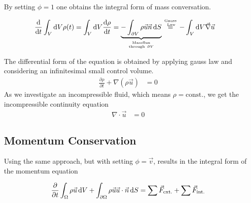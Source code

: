 By setting $\phi = 1$ one obtains the integral form of mass conversation.

\begin{align}
    \frac{\dif}{\dif t} \int_{V}\dif V \rho(t) =  \int_{V}\dif V \frac{\dif \rho}{\dif t}  &= \underbrace{-\int_{\partial V}
     \rho \vec{u}\vec{n}\dif S}_{\mathrm{Massflux} \atop \mathrm{through \ } \partial V} \stackrel{\text{Gauss} \atop \text{ Law}}{=} -\int_V \dif V \vec{\nabla}\vec{u}
\end{align}

The differential form of the equation is obtained by applying gauss law and considering an infinitesimal small control volume.
\begin{align}
     \frac{\partial \rho}{\partial t}  + \nabla \left(\rho \vec{u}\right) &= 0
\end{align}
As we investigate an incompressible fluid, which means $\rho = \text{const.}$, we get the incompressible continuity equation
\begin{align}
     \nabla \cdot \vec{u} &= 0
\end{align}


\subsection{Momentum Conservation}

Using the same approach, but with setting $\phi = \vec{v}$, results in the integral form of the momentum equation

\begin{align}
    \label{theorie:intimpulse}
    \pdn[]{t} \int_\Omega \rho \vec{u}\dif V + \int_{\partial\Omega} \rho\vec{u}\vec{u}\cdot \vec{n} \dif S =  \sum \vec{F}_{\text{ext.}} + \sum \vec{F}_{\text{int.}}
\end{align}

